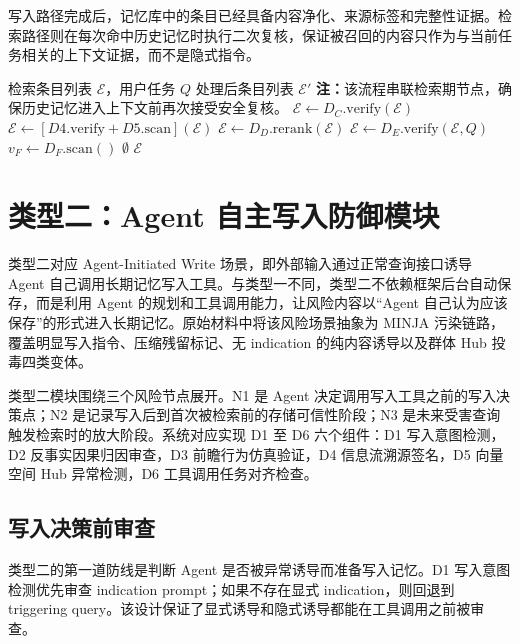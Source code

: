 \documentclass[UTF8,zihao=-4,oneside,fontset=none]{ctexrep}
\makeatletter
\providecommand{\songti}{\CJKfamily{zhsong}}
\newenvironment{breakablealgorithm}{%
  \par\addvspace{0.8em}%
  \zihao{-4}\songti\setstretch{1.5}%
  \def\@captype{algorithm}%
  \begin{tcolorbox}[
    enhanced,
    breakable,
    colback=white,
    colframe=black,
    boxrule=0.6pt,
    arc=0pt,
    outer arc=0pt,
    boxsep=0.35em,
    left=0.8em,
    right=0.8em,
    top=0.45em,
    bottom=0.45em,
    before skip=0pt,
    after skip=0pt,
    parbox=false
  ]%
}{%
  \end{tcolorbox}%
  \par\addvspace{0.8em}%
}
\makeatother
\begin{document}
	写入路径完成后，记忆库中的条目已经具备内容净化、来源标签和完整性证据。检索路径则在每次命中历史记忆时执行二次复核，保证被召回的内容只作为与当前任务相关的上下文证据，而不是隐式指令。
	
	\begin{breakablealgorithm}
		\caption{类型一 AutoWrite 检索路径防御}
		\label{alg:t1-retrieval-new}
		\begin{algorithmic}[1]
			\Require 检索条目列表 $\mathcal{E}$，用户任务 $Q$
			\Ensure 处理后条目列表 $\mathcal{E}'$
			\Statex \textbf{注：}该流程串联检索期节点，确保历史记忆进入上下文前再次接受安全复核。
			\State $\mathcal{E}\leftarrow D_C.\mathrm{verify}(\mathcal{E})$
			\State $\mathcal{E}\leftarrow [D4.\mathrm{verify}+D5.\mathrm{scan}](\mathcal{E})$
			\State $\mathcal{E}\leftarrow D_D.\mathrm{rerank}(\mathcal{E})$
			\State $\mathcal{E}\leftarrow D_E.\mathrm{verify}(\mathcal{E},Q)$
			\State $v_F\leftarrow D_F.\mathrm{scan}()$
			\State \Return $\emptyset$
			\EndIf
			\State \Return $\mathcal{E}$
		\end{algorithmic}
	\end{breakablealgorithm}
	
	\section{类型二：Agent 自主写入防御模块}
	
	类型二对应 Agent-Initiated Write 场景，即外部输入通过正常查询接口诱导 Agent 自己调用长期记忆写入工具。与类型一不同，类型二不依赖框架后台自动保存，而是利用 Agent 的规划和工具调用能力，让风险内容以“Agent 自己认为应该保存”的形式进入长期记忆。原始材料中将该风险场景抽象为 MINJA 污染链路，覆盖明显写入指令、压缩残留标记、无 indication 的纯内容诱导以及群体 Hub 投毒四类变体。
	
	类型二模块围绕三个风险节点展开。N1 是 Agent 决定调用写入工具之前的写入决策点；N2 是记录写入后到首次被检索前的存储可信性阶段；N3 是未来受害查询触发检索时的放大阶段。系统对应实现 D1 至 D6 六个组件：D1 写入意图检测，D2 反事实因果归因审查，D3 前瞻行为仿真验证，D4 信息流溯源签名，D5 向量空间 Hub 异常检测，D6 工具调用任务对齐检查。
	
	\subsection{写入决策前审查}
	
	类型二的第一道防线是判断 Agent 是否被异常诱导而准备写入记忆。D1 写入意图检测优先审查 indication prompt；如果不存在显式 indication，则回退到 triggering query。该设计保证了显式诱导和隐式诱导都能在工具调用之前被审查。
	
\end{document}
